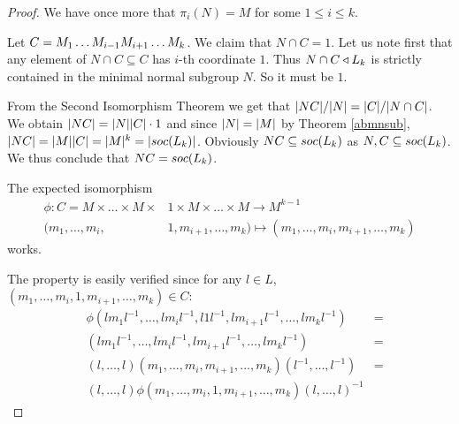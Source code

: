 \begin{proof}
    We have once more that $\pi_i(N) = M$ for some $1 \le i \le k$. 
    
    Let $C = \Mi[1]\ldots \Mi[i-1]\Mi[i+1]\ldots \Mi[k]$. We claim that $N \cap C = 1$. Let us note first that any element of $N \cap C \subseteq C$ has $i$-th coordinate $1$. Thus $N \cap C \nsub L_k$ is strictly contained in the minimal normal subgroup $N$. So it must be $1$.

    From the Second Isomorphism Theorem we get that $\card{NC}/\card{N} = \card{C} / \card{N \cap C}$.
    We obtain $\card{NC} = \card{N}\card{C}\cdot 1$ and since $\card{N} = \card{M}$ by Theorem \ref{abmnsub}, $\card{NC} = \card{M}\card{C} = \card{M}^k = \card{\soc{L_k}}$.
    Obviously $NC \subseteq \soc{L_k}$ as $N,C \subseteq \soc{L_k}$. We thus conclude that $NC = \soc{L_k}$.
    

    The expected isomorphism
    \begin{align*}
        \phi \colon C = M \times \ldots  \times M \times &1 \times M \times \ldots  \times M \longrightarrow M^{k-1} \\
        (m_1,\ldots ,m_i,&1,m_{i+1},\ldots ,m_{k}) \mapsto (m_1,\ldots ,m_i,m_{i+1},\ldots ,m_{k})
    \end{align*}
    works. 
    
    The property is easily verified since for any $l \in L$, $(m_1,\ldots ,m_i,1,m_{i+1},\ldots ,m_{k}) \in C$:
    \begin{align*}
        &\phi(lm_1l^{-1},\ldots ,lm_il^{-1},l1l^{-1},lm_{i+1}l^{-1},\ldots ,lm_{k}l^{-1}) &= \\
        &(lm_1l^{-1},\ldots ,lm_il^{-1},lm_{i+1}l^{-1},\ldots ,lm_{k}l^{-1}) &= \\
        &(l,\ldots ,l)(m_1,\ldots ,m_i,m_{i+1},\ldots ,m_{k})(l^{-1},\ldots ,l^{-1}) &= \\ 
        &(l,\ldots ,l)\phi(m_1,\ldots ,m_i,1,m_{i+1},\ldots ,m_{k})(l,\ldots ,l)^{-1}
    \end{align*}
\end{proof}
